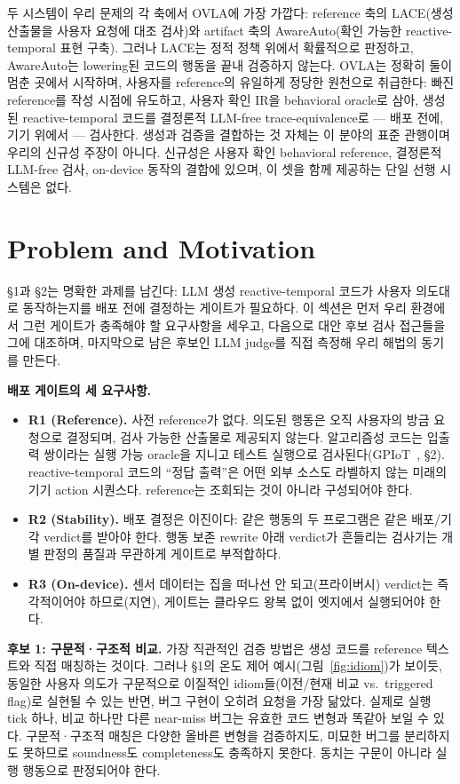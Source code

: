 \documentclass[sigconf,nonacm,anonymous,review]{acmart}
\begin{document}
두 시스템이 우리 문제의 각 축에서 OVLA에 가장 가깝다: reference 축의 LACE(생성 산출물을 사용자 요청에 대조 검사)와 artifact 축의 AwareAuto(확인 가능한 reactive-temporal 표현 구축). 그러나 LACE는 정적 정책 위에서 확률적으로 판정하고, AwareAuto는 lowering된 코드의 행동을 끝내 검증하지 않는다. OVLA는 정확히 둘이 멈춘 곳에서 시작하며, 사용자를 reference의 유일하게 정당한 원천으로 취급한다: 빠진 reference를 작성 시점에 유도하고, 사용자 확인 IR을 behavioral oracle로 삼아, 생성된 reactive-temporal 코드를 결정론적 LLM-free trace-equivalence로 — 배포 전에, 기기 위에서 — 검사한다. 생성과 검증을 결합하는 것 자체는 이 분야의 표준 관행이며 우리의 신규성 주장이 아니다. 신규성은 사용자 확인 behavioral reference, 결정론적 LLM-free 검사, on-device 동작의 결합에 있으며, 이 셋을 함께 제공하는 단일 선행 시스템은 없다.

\section{Problem and Motivation}

\S1과 \S2는 명확한 과제를 남긴다: LLM 생성 reactive-temporal 코드가 사용자 의도대로 동작하는지를 배포 전에 결정하는 게이트가 필요하다. 이 섹션은 먼저 우리 환경에서 그런 게이트가 충족해야 할 요구사항을 세우고, 다음으로 대안 후보 검사 접근들을 그에 대조하며, 마지막으로 남은 후보인 LLM judge를 직접 측정해 우리 해법의 동기를 만든다.

\textbf{배포 게이트의 세 요구사항.}
\begin{itemize}
\item \textbf{R1 (Reference).} 사전 reference가 없다. 의도된 행동은 오직 사용자의 방금 요청으로 결정되며, 검사 가능한 산출물로 제공되지 않는다. 알고리즘성 코드는 입출력 쌍이라는 실행 가능 oracle을 지니고 테스트 실행으로 검사된다(GPIoT~\cite{gpiot}, \S2). reactive-temporal 코드의 ``정답 출력''은 어떤 외부 소스도 라벨하지 않는 미래의 기기 action 시퀀스다. reference는 조회되는 것이 아니라 구성되어야 한다.
\item \textbf{R2 (Stability).} 배포 결정은 이진이다: 같은 행동의 두 프로그램은 같은 배포/기각 verdict를 받아야 한다. 행동 보존 rewrite 아래 verdict가 흔들리는 검사기는 개별 판정의 품질과 무관하게 게이트로 부적합하다.
\item \textbf{R3 (On-device).} 센서 데이터는 집을 떠나선 안 되고(프라이버시) verdict는 즉각적이어야 하므로(지연), 게이트는 클라우드 왕복 없이 엣지에서 실행되어야 한다.
\end{itemize}

\textbf{후보 1: 구문적·구조적 비교.} 가장 직관적인 검증 방법은 생성 코드를 reference 텍스트와 직접 매칭하는 것이다. 그러나 \S1의 온도 제어 예시(그림~\ref{fig:idiom})가 보이듯, 동일한 사용자 의도가 구문적으로 이질적인 idiom들(이전/현재 비교 vs.\ triggered flag)로 실현될 수 있는 반면, 버그 구현이 오히려 요청을 가장 닮았다. 실제로 실행 tick 하나, 비교 하나만 다른 near-miss 버그는 유효한 코드 변형과 똑같아 보일 수 있다. 구문적·구조적 매칭은 다양한 올바른 변형을 검증하지도, 미묘한 버그를 분리하지도 못하므로 soundness도 completeness도 충족하지 못한다. 동치는 구문이 아니라 실행 행동으로 판정되어야 한다.
\end{document}
